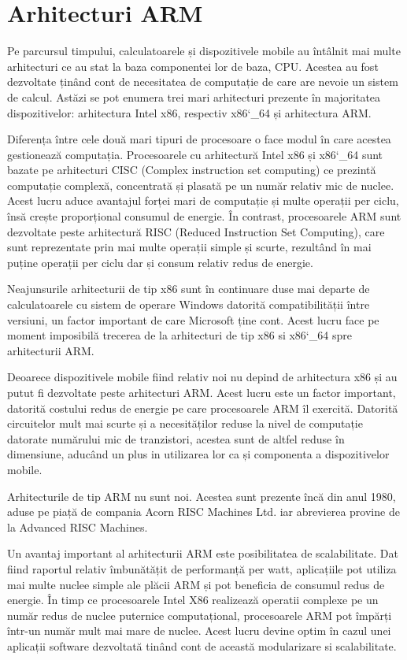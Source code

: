 	\section{Arhitecturi ARM}
	Pe parcursul timpului, calculatoarele și dispozitivele mobile au întâlnit mai multe arhitecturi ce au stat la baza componentei lor de baza, CPU. Acestea au fost dezvoltate ținând cont de necesitatea de computație de care are nevoie un sistem de calcul. Astăzi se pot enumera trei mari arhitecturi prezente în majoritatea dispozitivelor: arhitectura Intel x86, respectiv x86\char`_64 și arhitectura ARM. 
	
	Diferența între cele două mari tipuri de procesoare o face modul în care acestea gestionează computația. Procesoarele cu arhitectură Intel x86 și x86\char`_64 sunt bazate pe arhitecturi CISC (Complex instruction set computing) ce prezintă computație complexă, concentrată și plasată pe un număr relativ mic de nuclee. Acest lucru aduce avantajul forței mari de computație și multe operații per ciclu, însă crește proporțional consumul de energie. În contrast, procesoarele ARM sunt dezvoltate peste arhitectură RISC (Reduced Instruction Set Computing), care sunt reprezentate prin mai multe operații simple și scurte, rezultând în mai puține operații per ciclu dar și consum relativ redus de energie. 
	
	Neajunsurile arhitecturii de tip x86 sunt în continuare duse mai departe de calculatoarele cu sistem de operare Windows datorită compatibilității între versiuni, un factor important de care Microsoft ține cont. Acest lucru face pe moment imposibilă trecerea de la arhitecturi de tip x86 si x86\char`_64 spre arhitecturii ARM. 
	
	Deoarece dispozitivele mobile fiind relativ noi nu depind de arhitectura x86 și au putut fi dezvoltate peste arhitecturi ARM. Acest lucru este un factor important, datorită costului redus de energie pe care procesoarele ARM îl exercită. Datorită circuitelor mult mai scurte și a necesităților reduse la nivel de computație datorate numărului mic de tranzistori, acestea sunt de altfel reduse în dimensiune, aducând un plus in utilizarea lor ca și componenta a dispozitivelor mobile.
	
	Arhitecturile de tip ARM nu sunt noi. Acestea sunt prezente încă din anul 1980, aduse pe piață de compania Acorn RISC Machines Ltd. iar abrevierea provine de la Advanced RISC Machines. 
	
	Un avantaj important al arhitecturii ARM este posibilitatea de scalabilitate. Dat fiind raportul relativ îmbunătățit de performanță per watt, aplicațiile pot utiliza mai multe nuclee simple ale plăcii ARM și pot beneficia de consumul redus de energie. În timp ce procesoarele 
	Intel X86 realizează operatii complexe pe un număr redus de nuclee puternice computațional, procesoarele ARM pot împărți într-un număr mult mai mare de nuclee. Acest lucru devine optim în cazul unei aplicații software dezvoltată tinând cont de această modularizare si scalabilitate.
	\cite{arm_architecture_android}
	
